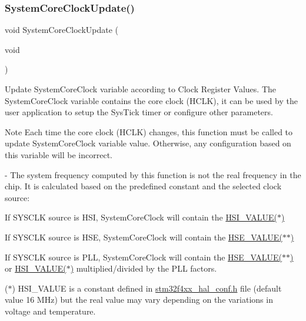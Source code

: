 \subsubsection{\texorpdfstring{System\+Core\+Clock\+Update()}{SystemCoreClockUpdate()}}
{\footnotesize\ttfamily void System\+Core\+Clock\+Update (\begin{DoxyParamCaption}\item[{void}]{ }\end{DoxyParamCaption})}



Update System\+Core\+Clock variable according to Clock Register Values. The System\+Core\+Clock variable contains the core clock (H\+C\+LK), it can be used by the user application to setup the Sys\+Tick timer or configure other parameters. 

\begin{DoxyNote}{Note}
Each time the core clock (H\+C\+LK) changes, this function must be called to update System\+Core\+Clock variable value. Otherwise, any configuration based on this variable will be incorrect.

-\/ The system frequency computed by this function is not the real frequency in the chip. It is calculated based on the predefined constant and the selected clock source\+:
\end{DoxyNote}

\begin{DoxyItemize}
\item If S\+Y\+S\+C\+LK source is H\+SI, System\+Core\+Clock will contain the \hyperlink{group___s_t_m32_f4xx___system___private___includes_gaaa8c76e274d0f6dd2cefb5d0b17fbc37}{H\+S\+I\+\_\+\+V\+A\+L\+U\+E($\ast$)}
\item If S\+Y\+S\+C\+LK source is H\+SE, System\+Core\+Clock will contain the \hyperlink{group___s_t_m32_f4xx___system___private___includes_gaeafcff4f57440c60e64812dddd13e7cb}{H\+S\+E\+\_\+\+V\+A\+L\+U\+E($\ast$$\ast$)}
\item If S\+Y\+S\+C\+LK source is P\+LL, System\+Core\+Clock will contain the \hyperlink{group___s_t_m32_f4xx___system___private___includes_gaeafcff4f57440c60e64812dddd13e7cb}{H\+S\+E\+\_\+\+V\+A\+L\+U\+E($\ast$$\ast$)} or \hyperlink{group___s_t_m32_f4xx___system___private___includes_gaaa8c76e274d0f6dd2cefb5d0b17fbc37}{H\+S\+I\+\_\+\+V\+A\+L\+U\+E($\ast$)} multiplied/divided by the P\+LL factors.
\end{DoxyItemize}

($\ast$) H\+S\+I\+\_\+\+V\+A\+L\+UE is a constant defined in \hyperlink{stm32f4xx__hal__conf_8h}{stm32f4xx\+\_\+hal\+\_\+conf.\+h} file (default value 16 M\+Hz) but the real value may vary depending on the variations in voltage and temperature.

